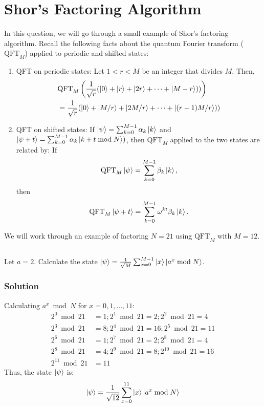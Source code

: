 \documentclass[12pt]{article} %
\begin{document}
\section{Shor's Factoring Algorithm}

In this question, we will go through a small example of Shor's factoring algorithm. Recall the following facts about the quantum Fourier transform (\(\text{QFT}_M\)) applied to periodic and shifted states:

\begin{enumerate}
    \item QFT on periodic states: Let \(1 < r < M\) be an integer that divides \(M\). Then,
    \begin{align}
        &\text{QFT}_M \left( \frac{1}{\sqrt{r}} (\ket{0} + \ket{r} + \ket{2r} + \dots + \ket{M-r})) \right) \\ &= \frac{1}{\sqrt{r}} (\ket{0} + \ket{M/r} + \ket{2M/r} + \dots + \ket{(r-1)M/r})) \label{eq:qft_periodic}
    \end{align}
    \item QFT on shifted states: If \(\ket{\psi} = \sum_{k=0}^{M-1} \alpha_k \ket{k}\) and \(\ket{\psi+t} = \sum_{k=0}^{M-1} \alpha_k \ket{k+t \bmod N})\), then \(\text{QFT}_M\) applied to the two states are related by: If
    \begin{equation} \label{eq:qft_psi}
        \text{QFT}_M \ket{\psi} = \sum_{k=0}^{M-1} \beta_k \ket{k},
    \end{equation}
    then
    \[ \text{QFT}_M \ket{\psi+t} = \sum_{k=0}^{M-1} \omega^{kt} \beta_k \ket{k}. \]
\end{enumerate}

We will work through an example of factoring \(N = 21\) using \(\text{QFT}_M\) with \(M = 12\).

\subsection{}
Let \(a = 2\). Calculate the state \(\ket{\psi} = \frac{1}{\sqrt{M}} \sum_{x=0}^{M-1} \ket{x} \ket{a^x \bmod N}\).
\subsubsection*{Solution}
Calculating \(a^x \bmod N\) for \(x = 0, 1, \dots, 11\):
\begin{align*}
    2^0 \bmod 21 &= 1 ; 2^1 \bmod 21 = 2 ; 2^2 \bmod 21 = 4 \\
    2^3 \bmod 21 &= 8 ; 2^4 \bmod 21 = 16 ; 2^5 \bmod 21 = 11 \\
    2^6 \bmod 21 &= 1 ; 2^7 \bmod 21 = 2 ; 2^8 \bmod 21 = 4 \\
    2^8 \bmod 21 &= 4 ; 2^9 \bmod 21 = 8 ; 2^{10} \bmod 21 = 16 \\
    2^{11} \bmod 21 &= 11
\end{align*}
Thus, the state \(\ket{\psi}\) is:
\[\ket{\psi} = \frac{1}{\sqrt{12}} \sum_{x=0}^{11} \ket{x} \ket{a^x \bmod N} \]
\end{document}
